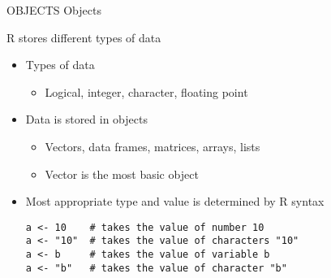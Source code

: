 \documentclass{beamer}
\begin{document}
\begin{frame}{OBJECTS}
Objects
\end{frame}

\begin{frame}{R stores different types of data}
    \begin{itemize}
        \item Types of data
        \begin{itemize}
            \item Logical, integer, character, floating point
        \end{itemize}
        \item Data is stored in objects
        \begin{itemize}
            \item Vectors, data frames, matrices, arrays, lists
            \item Vector is the most basic object
        \end{itemize}
        \item Most appropriate type and value is determined by R syntax
        \begin{verbatim}
a <- 10    # takes the value of number 10
a <- "10"  # takes the value of characters "10"
a <- b     # takes the value of variable b
a <- "b"   # takes the value of character "b"\end{verbatim}
    \end{itemize}
\end{frame}
\end{document}
